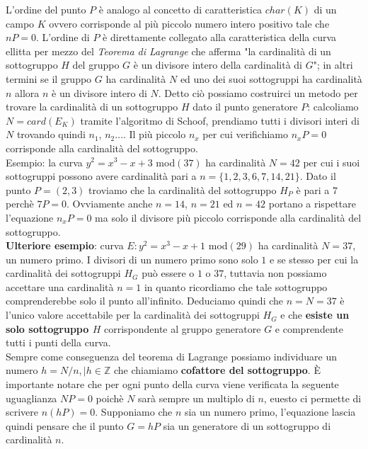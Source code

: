 \documentclass[a4paper,12pt]{tesiinfo}
\begin{document}
L'ordine del punto $P$ \`e analogo al concetto di caratteristica $char(K)$ di un campo $K$ ovvero corrisponde al pi\`u piccolo numero intero positivo tale che $nP = 0$. L'ordine di $P$ \`e direttamente collegato alla caratteristica della curva ellitta per mezzo del \textit{Teorema di Lagrange} che afferma "la cardinalit\`a di un sottogruppo $H$ del gruppo $G$ \`e un divisore intero della cardinalit\`a di $G$"; in altri termini se il gruppo $G$ ha cardinalit\`a $N$ ed uno dei suoi sottogruppi ha cardinalit\`a $n$ allora $n$ \`e un divisore intero di $N$. Detto ci\`o possiamo costruirci un metodo per trovare la cardinalit\`a di un sottogruppo $H$ dato il punto generatore $P$: calcoliamo $N = card(E_K)$ tramite l'algoritmo di Schoof, prendiamo tutti i divisori interi di $N$ trovando quindi $n_1$, $n_2 \ldots$. Il pi\`u piccolo $n_x$ per cui verifichiamo $n_xP = 0$ corrisponde alla cardinalit\`a del sottogruppo.
\\
Esempio: la curva $y^2 = x^3-x+3$ mod$(37)$ ha cardinalit\`a $N=42$ per cui i suoi sottogruppi possono avere cardinalit\`a pari a $n= \{1, 2, 3, 6, 7, 14, 21\}$. Dato il punto $P=(2, 3)$ troviamo che la cardinalit\`a del sottogruppo $H_P$ \`e pari a 7 perch\`e $7P = 0$. Ovviamente anche $n = 14$, $n = 21$ ed $n=42$ portano a rispettare l'equazione $n_xP=0$ ma solo il divisore pi\`u piccolo corrisponde alla cardinalit\`a del sottogruppo.
\\
\textbf{Ulteriore esempio}: curva $E: y^2 = x^3 -x+1$ mod$(29)$ ha cardinalit\`a $N=37$, un numero primo. I divisori di un numero primo sono solo $1$ e se stesso per cui la cardinalit\`a dei sottogruppi $H_G$ pu\`o essere o $1$ o $37$, tuttavia non possiamo accettare una cardinalit\`a $n=1$ in quanto ricordiamo che tale sottogruppo comprenderebbe solo il punto all'infinito. Deduciamo quindi che $n = N = 37$ \`e l'unico valore accettabile per la cardinalit\`a dei sottogruppi $H_G$ e che \textbf{esiste un solo sottogruppo $H$} corrispondente al gruppo generatore $G$ e comprendente tutti i punti della curva.
\\
Sempre come conseguenza del teorema di Lagrange possiamo individuare un numero $h= N \big / n, \mid h \in \mathbb{Z}$ che chiamiamo \textbf{cofattore del sottogruppo}. \`E importante notare che per ogni punto della curva viene verificata la seguente uguaglianza $NP=0$ poich\`e $N$ sar\`a sempre un multiplo di $n$, euesto ci permette di scrivere $n(hP)=0$. Supponiamo che $n$ sia un numero primo, l'equazione lascia quindi pensare che il punto $G = hP$ sia un generatore di un sottogruppo di cardinalit\`a $n$.
\end{document}
